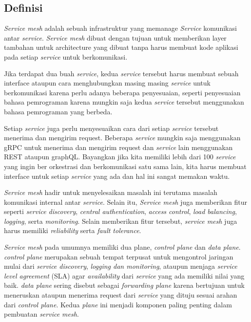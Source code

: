 \subsection{Definisi}

\textit{Service mesh} adalah sebuah infrastruktur yang memanage \textit{Service} komunikasi antar \textit{service}. \textit{Service mesh} dibuat dengan tujuan untuk memberikan layer tambahan untuk architecture yang dibuat tanpa harus membuat kode aplikasi pada setiap \textit{service} untuk berkomunikasi.\parencite{li2019}

Jika terdapat dua buah \textit{service}, kedua \textit{service} tersebut harus membuat sebuah interface ataupun cara menghubungkan masing masing \textit{service} untuk berkomunikasi karena perlu adanya beberapa penyesuaian, seperti penyesuaian bahasa pemrograman karena mungkin saja kedua \textit{service} tersebut menggunakan bahasa pemrograman yang berbeda.

Setiap \textit{service} juga perlu menyesuaikan cara dari setiap \textit{service} tersebut menerima dan mengirim request. Beberapa \textit{service} mungkin saja menggunakan gRPC untuk menerima dan mengirim request dan \textit{service} lain menggunakan REST ataupun graphQL. Bayangkan jika kita memiliki lebih dari 100 \textit{service} yang ingin ber orkestrasi dan berkomunikasi satu sama lain, kita harus membuat interface untuk setiap \textit{service} yang ada dan hal ini sangat memakan waktu.

\textit{Service mesh} hadir untuk menyelesaikan masalah ini terutama masalah komunikasi internal antar \textit{service}. Selain itu, \textit{Service mesh} juga memberikan fitur seperti \textit{service discovery}, \textit{central authentication}, \textit{access control}, \textit{load balancing}, \textit{logging}, serta \textit{monitoring}. Selain memberikan fitur tersebut, \textit{\textit{service} mesh} juga harus memiliki \textit{reliability} serta \textit{fault tolerance}. \parencite{li2019}

\textit{Service mesh} pada umumnya memiliki dua plane, \textit{control plane} dan \textit{data plane}. \textit{control plane} merupakan sebuah tempat terpusat untuk mengontrol jaringan mulai dari \textit{service discovery}, \textit{logging dan monitoring}, ataupun menjaga \textit{service level agreement} (SLA) agar \textit{availability} dari \textit{service} yang ada memiliki nilai yang baik. \textit{data plane} sering disebut sebagai \textit{forwarding plane} karena bertujuan untuk meneruskan ataupun menerima request dari \textit{service} yang dituju sesuai arahan dari \textit{control plane}. Kedua \textit{plane} ini menjadi komponen paling penting dalam pembuatan \textit{\textit{service} mesh}.

